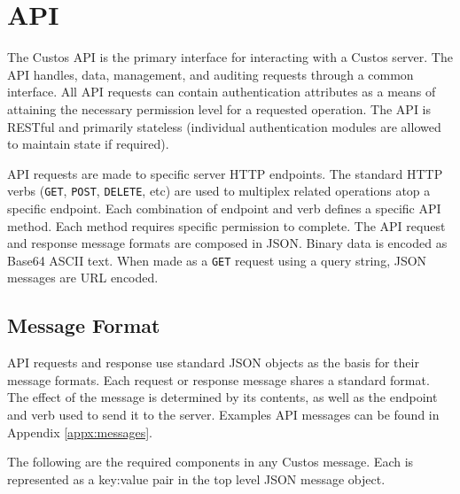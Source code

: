 \section{API}

The Custos API is the primary interface for interacting with a Custos
server. The API handles, data, management, and auditing requests
through a common interface. All API requests can contain
authentication attributes as a means of attaining the necessary
permission level for a requested operation. The API is RESTful and
primarily stateless (individual authentication modules are allowed to
maintain state if required).

API requests are made to specific server HTTP endpoints. The standard
HTTP verbs (\texttt{GET}, \texttt{POST}, \texttt{DELETE}, etc) are
used to multiplex related operations atop a specific endpoint. Each
combination of endpoint and verb defines a specific API method. Each
method requires specific permission to complete. The API request and
response message formats are composed in JSON. Binary data is encoded
as Base64 ASCII text. When made as a \texttt{GET} request using a
query string, JSON messages are URL encoded.

\subsection{Message Format}

API requests and response use standard JSON objects as the basis for
their message formats. Each request or response message shares a
standard format. The effect of the message is determined by its
contents, as well as the endpoint and verb used to send it to the
server. Examples API messages can be found in Appendix
\ref{appx:messages}.

The following are the required components in any Custos message. Each
is represented as a key:value pair in the top level JSON message
object.

